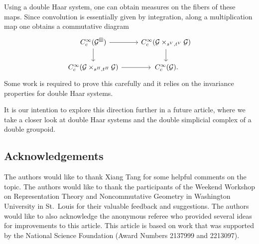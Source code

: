 \documentclass[pdftex]{sigma}
\numberwithin{equation}{section}
\theoremstyle{definition}
\newcommand{\CG}{\mathcal{G}}
\begin{document}
Using a double Haar system, one can obtain measures on the fibers of these maps. Since convolution is essentially given by integration, along a multiplication map one obtains a commutative diagram
\[
\begin{tikzcd}
  C^\infty_c(\CG^\boxplus) \arrow[d] \arrow[r] & C_c^\infty(\CG \times_{s^V, t^V} \CG ) \arrow[d] \\
  C^\infty_c(\CG \times_{s^H, t^H} \CG) \arrow[r] &\, C^\infty_c(\CG).
\end{tikzcd}
\]
Some work is required to prove this carefully and it relies on the invariance properties for double Haar systems.

It is our intention to explore this direction further in a future article, where we take a closer look at double Haar systems and the double simplicial complex of a double groupoid.

\subsection*{Acknowledgements}

The authors would like to thank Xiang Tang for some helpful comments on the topic. The authors would like to thank the participants of the Weekend Workshop on Representation Theory and Noncommutative Geometry in Washington University in St.~Louis for their valuable feedback and suggestions. The authors would like to also acknowledge the anonymous referee who provided several ideas for improvements to this article. This article is based on work that was supported by the National Science Foundation (Award Numbers 2137999 and 2213097).
\end{document}
